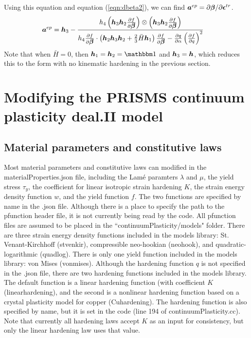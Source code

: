 \documentclass[10pt]{article}
\begin{document}
Using this equation and equation (\ref{eqn:dbeta2}), we can find $\mbox{\boldmath$ a$}^{ep} = \partial \mbox{\boldmath$\beta$}/\partial \mbox{\boldmath$\epsilon$}^{tr}$.
\begin{equation}
\begin{aligned}
\mbox{\boldmath$ a$}^{ep}
&=
\mbox{\boldmath$ h$}_3
-
\frac{h_4
\left(\mbox{\boldmath$ h$}_3\mbox{\boldmath$ h$}_2\frac{\partial f}{\partial\mbox{\boldmath$\beta$}}\right)\otimes
\left(\mbox{\boldmath$ h$}_3\mbox{\boldmath$ h$}_2\frac{\partial f}{\partial \mbox{\boldmath$\beta$}}\right)}
{h_4
\frac{\partial f}{\partial \mbox{\boldmath$\beta$}}\cdot
\left(
\mbox{\boldmath$ h$}_2\mbox{\boldmath$ h$}_3\mbox{\boldmath$ h$}_2
 +
\frac{2}{3}\bar{H}\mbox{\boldmath$ h$}_1
\right)
\frac{\partial f}{\partial\mbox{\boldmath$\beta$}}
 -
{\frac{\partial q}{\partial \alpha}
\left(\frac{\partial f}{\partial q}\right)^2}}
\end{aligned}
\end{equation}
Note that when $\bar{H} = 0$, then $\bh_1 = \bh_2 = \iso$ and $\mbox{\boldmath$ h$}_3 = \mbox{\boldmath$ h$}$, which reduces this to the form with no kinematic hardening in the previous section.


\pagebreak

\section{Modifying the PRISMS continuum plasticity deal.II model}

\subsection{Material parameters and constitutive laws}
Most material parameters and constitutive laws can modified in the materialProperties.json file, including the Lam\'e paramters $\lambda$ and $\mu$, the yield stress $\tau_y$, the coefficient for linear isotropic strain hardening $K$, the strain energy density function $w$, and the yield function $f$. The two functions are specified by name in the .json file. Although there is a place to specify the path to the pfunction header file, it is not currently being read by the code. All pfunction files are assumed to be placed in the ``continuumPlasticity/models" folder. There are three strain energy density functions included in the models library: St. Venant-Kirchhoff (stvenkir), compressible neo-hookian (neohook), and quadratic-logarithmic (quadlog). There is only one yield function included in the models library: von Mises (von\textunderscore mises). Although the hardening function $q$ is not specified in the .json file, there are two hardening functions included in the models library. The default function is a linear hardening function (with coefficient $K$ (linear\textunderscore hardening), and the second is a nonlinear hardening function based on a crystal plasticity model for copper (Cu\textunderscore hardening). The hardening function is also specified by name, but it is set in the code (line 194 of continuumPlasticity.cc). Note that currently all hardening laws accept $K$ as an input for consistency, but only the linear hardening law uses that value.
\end{document}
